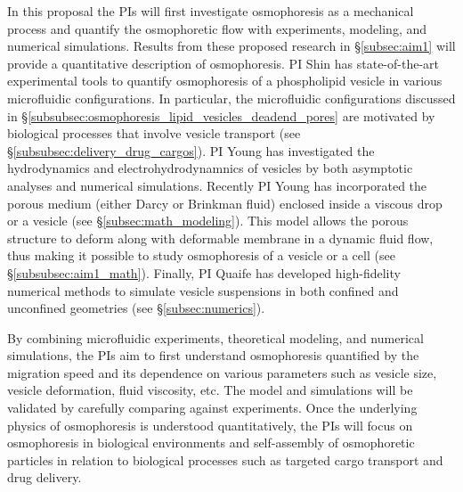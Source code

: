\documentclass[11pt]{article}
\begin{document}
In this proposal the PIs will first investigate osmophoresis as a
mechanical process and quantify the osmophoretic flow with experiments,
modeling, and numerical simulations.  Results from these proposed
research in \S\ref{subsec:aim1} will provide a quantitative description
of osmophoresis.  PI Shin has state-of-the-art experimental tools to
quantify osmophoresis of a phospholipid vesicle in various microfluidic
configurations.  In particular, the microfluidic configurations
discussed in \S\ref{subsubsec:osmophoresis_lipid_vesicles_deadend_pores}
are motivated by biological processes that involve vesicle transport
(see \S\ref{subsubsec:delivery_drug_cargos}).  PI Young has investigated
the hydrodynamics and electrohydrodynamnics of vesicles by both
asymptotic analyses and numerical simulations. Recently PI Young has
incorporated the porous medium (either Darcy or Brinkman fluid) enclosed
inside a viscous drop or a vesicle (see \S\ref{subsec:math_modeling}).
This model allows the porous structure to deform along with deformable
membrane in a dynamic fluid flow, thus making it possible to study
osmophoresis of a vesicle or a cell (see \S\ref{subsubsec:aim1_math}).
Finally, PI Quaife has developed high-fidelity numerical methods to
simulate vesicle suspensions in both confined and unconfined geometries
(see \S\ref{subsec:numerics}). 

By combining microfluidic experiments, theoretical modeling, and
numerical simulations, the PIs aim to first understand osmophoresis
quantified by the migration speed and its dependence on various
parameters such as vesicle size, vesicle deformation, fluid viscosity,
etc. The model and simulations will be validated by carefully comparing
against experiments.  Once the underlying physics of osmophoresis is
understood quantitatively, the PIs will focus on osmophoresis in
biological environments and self-assembly of osmophoretic particles in
relation to biological processes such as targeted cargo transport and
drug delivery.

\end{document}
